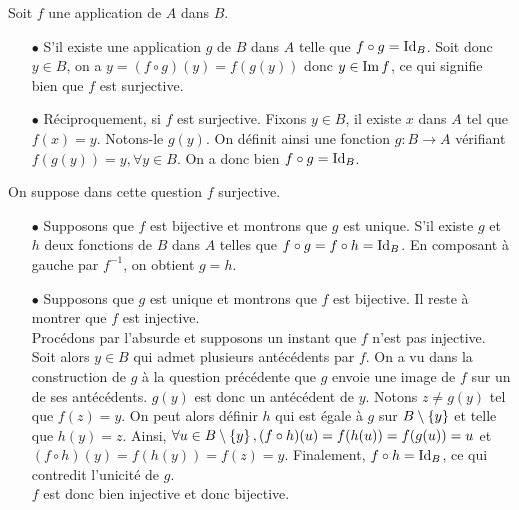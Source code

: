 \documentclass{magnolia}
\begin{document}
\begin{sol}
Soit $f$ une application de $A$ dans $B$.
\begin{questions}
\question
  \begin{questions}
  \question 
  \begin{itemize}
  \item[$\bullet$]S'il existe une application $g$ de $B$ dans $A$ telle que $f\circ g=\operatorname{Id}_{B}$. 
   Soit donc $y\in B$, on a $y=(f\circ g) (y)=f(g(y))$ donc $y\in \operatorname{Im} f$, ce qui signifie bien que $f$ est surjective.
  
  \item[$\bullet$]Réciproquement, si $f$ est surjective. Fixons $y\in B$, il existe $x$ dans $A$ tel que $f(x)=y$. Notons-le $g(y)$. On définit ainsi une fonction $g:B\to A$ vérifiant $f(g(y))=y, \forall y \in B$. On a donc bien $f\circ g=\operatorname{Id}_{B}$.
  \end{itemize}
  \question On suppose dans cette question $f$ surjective.
  
  \begin{itemize}
  \item[$\bullet$] Supposons que $f$ est bijective et montrons que $g$ est unique.
  S'il existe $g$ et $h$ deux fonctions de $B$ dans $A$ telles que $f\circ g=f\circ h=\operatorname{Id}_{B}$. En composant à gauche par $f^{-1}$, on obtient $g=h$. 
  
  \item[$\bullet$] Supposons que $g$ est unique et montrons que $f$ est bijective.
  Il reste à montrer que $f$ est injective.\\
   Procédons par l'absurde et supposons un instant que $f$ n'est pas injective. Soit alors $y\in B$ qui admet plusieurs antécédents par $f$. On a vu dans la construction de $g$ à la question précédente que $g$ envoie une image de $f$ sur un de ses antécédents. $g(y)$ est donc un antécédent de $y$. Notons $z\neq g(y)$ tel que $f(z)= y$. On peut alors définir $h$ qui est égale à $g$ sur $B\setminus\left\{y\right\}$ et telle que $h(y)=z$.
  Ainsi, $\forall u \in B\setminus\left\{y\right\}, (f\circ h)(u)=f(h(u))=f(g(u))=u$ et $(f\circ h)(y)=f(h(y))=f(z)=y$. Finalement, $f\circ h=\operatorname{Id}_{B}$, ce qui contredit l'unicité de $g$.\\
  $f$ est donc bien injective et donc bijective.
  

\end{itemize}
\end{questions}
\end{questions}
\end{sol}
\end{document}
